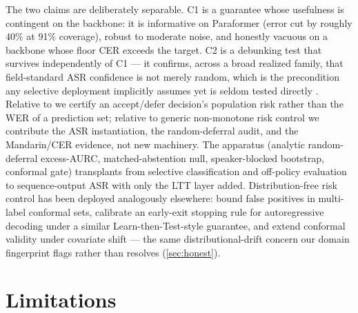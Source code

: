 \documentclass[11pt]{article}
\begin{document}
The two claims are deliberately separable. C1 is a guarantee whose usefulness is
contingent on the backbone: it is informative on Paraformer (error cut by roughly $40\%$
at 91\% coverage), robust to moderate noise, and honestly vacuous on a backbone whose
floor CER exceeds the target. C2 is a debunking test that survives independently of C1
--- it confirms, across a broad realized family, that field-standard ASR confidence is
not merely random, which is the precondition any selective deployment implicitly
assumes yet is seldom tested directly \citep{traub2024selective}. Relative to \citet{ernez2023conformal} we
certify an accept/defer decision's population risk rather than the WER of a prediction
set; relative to generic non-monotone risk control
\citep{angelopoulos2026nonmonotone,yu2026joint} we contribute the ASR instantiation,
the random-deferral audit, and the Mandarin/CER evidence, not new machinery. The
apparatus (analytic random-deferral excess-AURC, matched-abstention null,
speaker-blocked bootstrap, conformal gate) transplants from selective classification
and off-policy evaluation to sequence-output ASR with only the LTT layer added.
Distribution-free risk control has been deployed analogously elsewhere:
\citet{fisch2022limitedfp} bound false positives in multi-label conformal sets,
\citet{schuster2022calm} calibrate an early-exit stopping rule for autoregressive
decoding under a similar Learn-then-Test-style guarantee, and \citet{tibshirani2019covariateshift}
extend conformal validity under covariate shift --- the same distributional-drift
concern our domain fingerprint flags rather than resolves (\cref{sec:honest}).

\section{Limitations}\label{sec:limitations}
\end{document}
